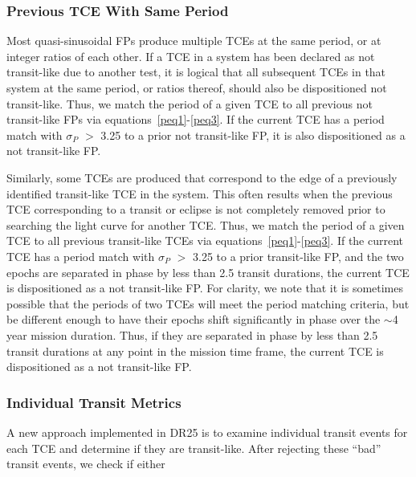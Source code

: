

\subsubsection{Previous TCE With Same Period}
\label{s:sameperiod}
Most quasi-sinusoidal FPs produce multiple TCEs at the same period, or at integer ratios of each other. If a TCE in a system has been declared as not transit-like due to another test, it is logical that all subsequent TCEs in that system at the same period, or ratios thereof, should also be dispositioned not transit-like. Thus, we match the period of a given TCE to all previous not transit-like FPs via equations~\ref{peq1}-\ref{peq3}. If the current TCE has a period match with $\sigma_{P}$ $>$ 3.25 to a prior not transit-like FP, it is also dispositioned as a not transit-like FP.

Similarly, some TCEs are produced that correspond to the edge of a previously identified transit-like TCE in the system. This often results when the previous TCE corresponding to a transit or eclipse is not completely removed prior to searching the light curve for another TCE. Thus, we match the period of a given TCE to all previous transit-like TCEs via equations~\ref{peq1}-\ref{peq3}.  If the current TCE has a period match with $\sigma_{P}$ $>$ 3.25 to a prior transit-like FP, and the two epochs are separated in phase by less than 2.5 transit durations, the current TCE is dispositioned as a not transit-like FP. For clarity, we note that it is sometimes possible that the periods of two TCEs will meet the period matching criteria, but be different enough to have their epochs shift significantly in phase over the $\sim$4 year mission duration. Thus, if they are separated in phase by less than 2.5 transit durations at any point in the mission time frame, the current TCE is dispositioned as a not transit-like FP.



\subsubsection{Individual Transit Metrics}
\label{s:indivtrans}
A new approach implemented in DR25 is to examine individual transit events for each TCE and determine if they are transit-like. After rejecting these ``bad'' transit events, we check if either


